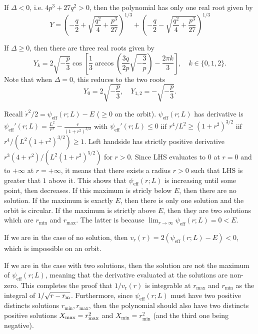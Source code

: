 \documentclass[11pt]{article}
\newcommand{\rr}{\mathrm{r}}
\newcommand{\vr}{v_{\rr}}
\newcommand{\rmax}{r_{\max}}
\newcommand{\rmin}{r_{\min}}
\newcommand{\psieff}{\psi_{\mathrm{eff}}}
\begin{document}
If $\Delta<0$, i.e. $4p^{3}+27q^{2}>0$, then the polynomial has
only one real root given by
\begin{equation}
Y=\left(-\frac{q}{2}+\sqrt{\frac{q^{2}}{4}+\frac{p^{3}}{27}}\right)^{1/3}+\left(-\frac{q}{2}-\sqrt{\frac{q^{2}}{4}+\frac{p^{3}}{27}}\right)^{1/3}
\label{eq:Neg_discriminant}
\end{equation}

If $\Delta\geq0$, then there are three
real roots given by
\begin{equation}
Y_{k}=2\sqrt{-\frac{p}{3}}\cos\left[\frac{1}{3}\arccos\left(\frac{3q}{2p}\sqrt{-\frac{3}{p}}\right)-\frac{2\pi k}{3}\right],\quad k\in\{0,1,2\}.
\label{eq:Pos_discriminant}
\end{equation}
Note that when $\Delta=0$, this reduces to the two roots 
\begin{equation}
Y_{0}=2\sqrt{-\frac{p}{3}},\quad Y_{1,2}=-\sqrt{-\frac{p}{3}}.
\label{eq:Null_discriminant}
\end{equation}

 Recall $\dot{r}^{2}/2=\psieff(r;L)-E$ ($\geq0$ on the
orbit). $\psieff(r;L)$ has derivative is $\psieff'(r;L)=\frac{L^{2}}{r^{3}}-\frac{r}{(1+r^{2})^{3/2}}$
with $\psieff'(r;L)\leq0$ iif $r^{4}/L^{2}\geq(1+r^{2})^{3/2}$ iif $r^{4}/(L^{2}(1+r^{2})^{3/2})\geq 1$. Left handside has strictly positive derivative $r^{3}(4+r^{2})/(L^{2}(1+r^{2})^{5/2})$ for $r>0$. Since LHS evaluates to $0$ at $r=0$ and to $+\infty$ at $r=+\infty$, it means that there exists a radius $r>0$ such that LHS is greater that $1$ above it. This shows that $\psieff(r;L)$
is increasing until some point, then decreases. If this maximum is
stricly below $E$, then there are no solution. If the maximum is
exactly $E$, then there is only one solution and the orbit is circular.
If the maximum is strictly above $E$, then they are two solutions
which are $\rmin$ and $\rmax$. The latter is because $\lim_{r\rightarrow\infty}\psieff(r;L)=0<E$. 

If we are in the case of no solution, then $v_{r}(r)=2(\psieff(r;L)-E)<0$,
which is impossible on an orbit.

If we are in the case with two solutions, then the solution are not
the maximum of $\psieff(r;L)$, meaning that the derivative
evaluated at the solutions are non-zero. This completes the proof
that $1/\vr(r)$ is integrable at $\rmax$ and $\rmin$ as
the integral of $1/\sqrt{r-r_{{\rm m}}}$. Furthermore, since $\psieff(r;L)$
must have two positive distincts solutions $\rmin,\rmax$, then
the polynomial should also have two distincts positive solutions $X_{{\rm max}}=\rmax^{2}$
and $X_{\min}=\rmin^{2}$ (and the third one being negative).
\end{document}
